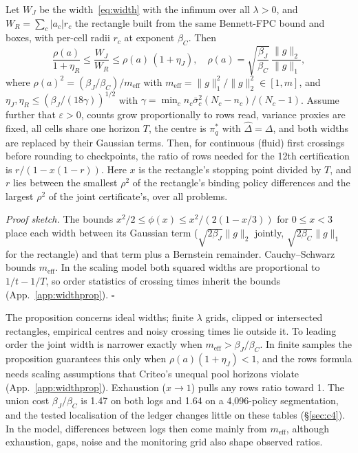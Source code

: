 \documentclass[sigconf,anonymous,review]{acmart}
\newcommand{\eps}{\varepsilon}
\newcommand{\meff}{m_{\text{eff}}}
\begin{document}
\begin{proposition}\label{prop:width}
Let $W_J$ be the width~\eqref{eq:width} with the infimum over all $\lambda>0$, and $W_R = \sum_c |a_c| r_c$ the rectangle built from the same Bennett-FPC bound and boxes, with per-cell radii $r_c$ at exponent $\beta_C$. Then
\[
\frac{\rho(a)}{1+\eta_R} \le \frac{W_J}{W_R} \le \rho(a)\,(1+\eta_J),\quad
\rho(a) = \sqrt{\frac{\beta_J}{\beta_C}}\,\frac{\|g\|_2}{\|g\|_1},
\]
where $\rho(a)^2 = (\beta_J/\beta_C)/\meff$ with $\meff = \|g\|_1^2/\|g\|_2^2 \in [1, m]$, and $\eta_J, \eta_R \le (\beta_J/(18\gamma))^{1/2}$ with $\gamma = \min_c n_c \bar\sigma_c^2 (N_c-n_c)/(N_c-1)$. Assume further that $\eps > 0$, counts grow proportionally to rows read, variance proxies are fixed, all cells share one horizon $T$, the centre is $\pi^*_q$ with $\hat\Delta = \Delta$, and both widths are replaced by their Gaussian terms. Then, for continuous (fluid) first crossings before rounding to checkpoints, the ratio of rows needed for the 12th certification is $r/(1 - x(1-r))$. Here $x$ is the rectangle's stopping point divided by $T$, and $r$ lies between the smallest $\rho^2$ of the rectangle's binding policy differences and the largest $\rho^2$ of the joint certificate's, over all problems.
\end{proposition}

\noindent\emph{Proof sketch.} The bounds $x^2/2 \le \phi(x) \le x^2/(2(1-x/3))$ for $0 \le x < 3$ place each width between its Gaussian term ($\sqrt{2\beta_J}\|g\|_2$ jointly, $\sqrt{2\beta_C}\|g\|_1$ for the rectangle) and that term plus a Bernstein remainder. Cauchy--Schwarz bounds $\meff$. In the scaling model both squared widths are proportional to $1/t - 1/T$, so order statistics of crossing times inherit the bounds (App.~\ref{app:widthprop}). $\square$

The proposition concerns ideal widths; finite $\lambda$ grids, clipped or intersected rectangles, empirical centres and noisy crossing times lie outside it. To leading order the joint width is narrower exactly when $\meff > \beta_J/\beta_C$. In finite samples the proposition guarantees this only when $\rho(a)(1+\eta_J) < 1$, and the rows formula needs scaling assumptions that Criteo's unequal pool horizons violate (App.~\ref{app:widthprop}). Exhaustion ($x \to 1$) pulls any rows ratio toward 1. The union cost $\beta_J/\beta_C$ is 1.47 on both logs and 1.64 on a 4,096-policy segmentation, and the tested localisation of the ledger changes little on these tables (\S\ref{sec:c4}). In the model, differences between logs then come mainly from $\meff$, although exhaustion, gaps, noise and the monitoring grid also shape observed ratios.
\end{document}
